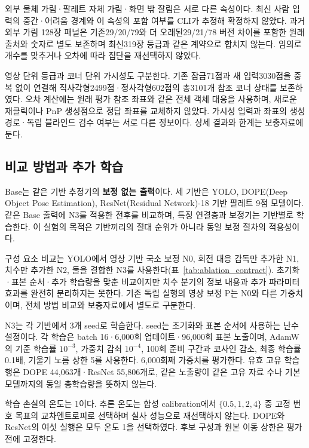 외부 물체 가림·팔레트 자체 가림·화면 밖 잘림은 서로 다른 속성이다. 최신 사람 입력의 중간·어려움 경계와 이 속성의 포함 여부를 CLI가 추정해 확정하지 않았다. 과거 외부 가림 128장 패널은 기존29/20/79와 더 오래된29/21/78 버전 차이를 포함한 원래 출처와 숫자로 별도 보존하며 최신319장 등급과 같은 계약으로 합치지 않는다. 임의로 개수를 맞추거나 오차에 따라 집단을 재선택하지 않았다.

영상 단위 등급과 코너 단위 가시성도 구분한다. 기존 잠금71점과 새 입력3030점을 중복 없이 연결해 직사각형2499점·정사각형602점의 총3101개 참조 코너 상태를 보존하였다. 오차 계산에는 원래 평가 참조 좌표와 같은 전체 객체 대응을 사용하며, 새로운 재클릭이나 PnP 생성점으로 정답 좌표를 교체하지 않았다. 가시성 입력과 좌표의 생성 경로·독립 블라인드 검수 여부는 서로 다른 정보이다. 상세 결과와 한계는 보충자료에 둔다.


\subsection{비교 방법과 추가 학습}
Base는 같은 기반 추정기의 \textbf{보정 없는 출력}이다. 세 기반은 YOLO, DOPE(Deep Object Pose Estimation)\cite{dope2018}, ResNet(Residual Network)-18 기반 팔레트 9점 모델\cite{simple2018}이다. 같은 Base 출력에 N3를 적용한 전후를 비교하며, 특징 연결층과 보정기는 기반별로 학습한다. 이 실험의 목적은 기반끼리의 절대 순위가 아니라 동일 보정 절차의 적용성이다.

구성 요소 비교는 YOLO에서 영상 기반 국소 보정 N0, 회전 대응 감독만 추가한 N1, 치수만 추가한 N2, 둘을 결합한 N3를 사용한다(표~\ref{tab:ablation_contract}). 초기화·표본 순서·추가 학습량을 맞춘 비교이지만 치수 분기의 정보 내용과 추가 파라미터 효과를 완전히 분리하지는 못한다. 기존 독립 실행의 영상 보정 P는 N0와 다른 가중치이며, 전체 방법 비교와 보충자료에서 별도로 구분한다.


N3는 각 기반에서 3개 seed로 학습한다. seed는 초기화와 표본 순서에 사용하는 난수 설정이다. 각 학습은 batch 16·6,000회 업데이트·96,000회 표본 노출이며, AdamW의 기준 학습률 $10^{-3}$, 가중치 감쇠 $10^{-4}$, 100회 준비 구간과 코사인 감소, 최종 학습률 0.1배, 기울기 노름 상한 5를 사용한다. 6,000회째 가중치를 평가한다. 유효 고유 학습 행은 DOPE 44,063개·ResNet 55,806개로, 같은 노출량이 같은 고유 자료 수나 기본 모델까지의 동일 총학습량을 뜻하지 않는다.

학습 손실의 온도는 1이다. 추론 온도는 합성 calibration에서 $\{0.5,1,2,4\}$ 중 고정 번호 목표의 교차엔트로피로 선택하며 실사 성능으로 재선택하지 않는다. DOPE와 ResNet의 여섯 실행은 모두 온도 1을 선택하였다. 후보 구성과 원본 이동 상한은 평가 전에 고정한다.

